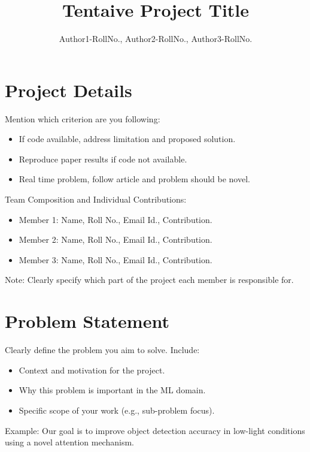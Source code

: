 \documentclass[lettersize,journal]{IEEEtran}
\begin{document}
\title{Tentaive Project Title}

\author{Author1-RollNo., Author2-RollNo., Author3-RollNo.}



\maketitle




\section{Project Details}
Mention which criterion are you following:
\begin{itemize}
    \item If code available, address limitation and proposed solution.
    \item Reproduce paper results if code not available.
    \item Real time problem, follow article and problem should be novel.
\end{itemize}

Team Composition and Individual Contributions:
\begin{itemize}
    \item  Member 1: Name, Roll No., Email Id., Contribution.
    \item  Member 2: Name, Roll No., Email Id., Contribution.
    \item  Member 3: Name, Roll No., Email Id., Contribution.
\end{itemize}
Note: Clearly specify which part of the project each member is responsible for.

\section{Problem Statement}
Clearly define the problem you aim to solve. 
Include:
\begin{itemize}
    \item Context and motivation for the project.
    \item Why this problem is important in the ML domain.
    \item Specific scope of your work (e.g., sub-problem focus).
\end{itemize}
Example: Our goal is to improve object detection accuracy in low-light conditions using a novel attention
mechanism.
\end{document}
